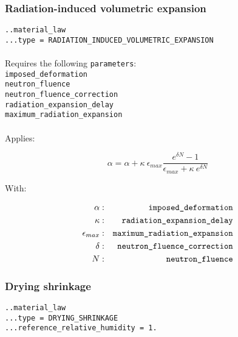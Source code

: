 \documentclass[10pt]{article}
\begin{document}
\subsubsection{Radiation-induced volumetric expansion}

\noindent \verb+..material_law+\\
\verb+...type = RADIATION_INDUCED_VOLUMETRIC_EXPANSION+

\paragraph{}Requires the following \verb+parameters+:\\

\noindent \verb+imposed_deformation+\\
\verb+neutron_fluence+\\
\verb+neutron_fluence_correction+\\
\verb+radiation_expansion_delay+\\
\verb+maximum_radiation_expansion+\\

\paragraph{}Applies:

\begin{equation}
	\alpha = \alpha + \kappa\ \epsilon_{max} \frac{e^{\delta N}-1}{\epsilon_{max}+\kappa\ e^{\delta N}}
\end{equation}

With:

\begin{eqnarray}
	\alpha & : & \verb+imposed_deformation+ \notag \\
	\kappa & : & \verb+radiation_expansion_delay+\notag  \\
	\epsilon_{max} & : & \verb+maximum_radiation_expansion+ \notag \\
	\delta & : & \verb+neutron_fluence_correction+ \notag \\
	N & : & \verb+neutron_fluence+ \notag 
\end{eqnarray}

\subsubsection{Drying shrinkage}

\noindent \verb+..material_law+\\
\verb+...type = DRYING_SHRINKAGE+\\
\verb+...reference_relative_humidity = 1.+
\end{document}

